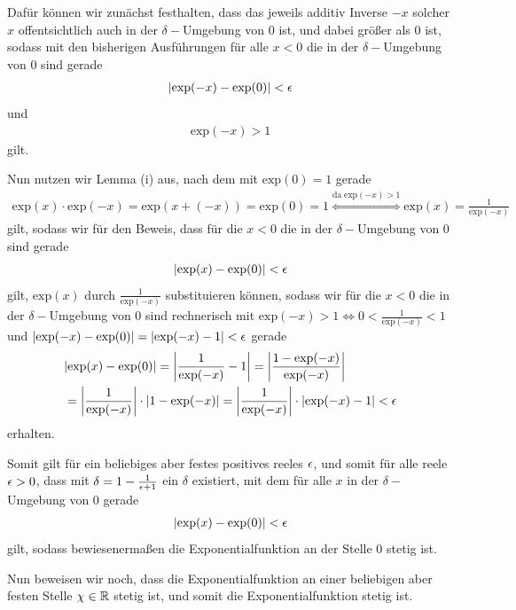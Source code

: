 \begin{lsg}
\begin{enumerate}[label=$\mathrm{(\roman*)}$, ref=$\mathrm{\roman*}$]
Dafür können wir zunächst festhalten, dass das jeweils additiv Inverse $-x$ 
solcher $x$ offentsichtlich auch in der $\delta-$Umgebung von $0$ ist, und dabei 
größer als $0$ ist, sodass mit den bisherigen Ausführungen für alle $x<0$ die in 
der $\delta-$Umgebung von $0$ sind gerade
\begin{align*}
  |\textrm{exp}(-x)-\textrm{exp}(0)|<\epsilon
 \end{align*}
und
\begin{align*}
  \textrm{exp}(-x)>1
 \end{align*}
 gilt.
 
 Nun nutzen wir Lemma (i) aus, nach dem mit $\textrm{exp}(0)=1$ gerade
 \begin{align*}
  \textrm{exp}(x) \cdot \textrm{exp}(-x)=\textrm{exp}(x+(-x))=\textrm{exp}(0)=1 
\stackrel{\textrm{da} \; \textrm{exp}(-x) >1}{\Leftrightarrow} \textrm{exp}(x)= 
\frac{1}{\textrm{exp}(-x)}
 \end{align*}gilt, sodass wir für den Beweis, dass für die $x<0$ die in der 
$\delta-$Umgebung von $0$ sind gerade
\begin{align*}
  |\textrm{exp}(x)-\textrm{exp}(0)|<\epsilon
 \end{align*}
gilt, $\textrm{exp}(x)$ durch $\frac{1}{\textrm{exp}(-x)}$ substituieren können, 
sodass wir für die $x<0$ die in der $\delta-$Umgebung von $0$ sind rechnerisch 
mit \newline $\textrm{exp}(-x)>1 \Leftrightarrow 0<\frac{1}{\textrm{exp}(-x)} <1 
$ und $|\textrm{exp}(-x)-\textrm{exp}(0)|=|\textrm{exp}(-x)-1|<\epsilon$ gerade
\begin{align*}
  &|\textrm{exp}(x)-\textrm{exp}(0)|= \left|\frac{1}{\textrm{exp}(-x)}-1\right| 
= \left|\frac{1-\textrm{exp}(-x)}{\textrm{exp}(-x)} \right|\\&= 
\left|\frac{1}{\textrm{exp}(-x)} \right|\cdot\left|1-\textrm{exp}(-x) \right|= 
\left|\frac{1}{\textrm{exp}(-x)} \right|\cdot\left|\textrm{exp}(-x)-1 \right|<\epsilon
 \end{align*}
erhalten.

Somit gilt für ein beliebiges aber festes positives reeles $\epsilon$, und somit für 
alle reele $\epsilon>0$, dass mit $\delta=1-\frac{1}{\epsilon+1}$ ein $\delta$ existiert, 
mit dem für alle $x$ in der $\delta-$ Umgebung von $0$ gerade
\begin{align*}
  |\textrm{exp}(x)-\textrm{exp}(0)|<\epsilon
 \end{align*}
gilt, sodass bewiesenermaßen die Exponentialfunktion an der Stelle $0$ stetig ist.
 
Nun beweisen wir noch, dass die Exponentialfunktion an einer beliebigen aber festen Stelle $\chi \in \mathbb{R}$ stetig ist, und somit die Exponentialfunktion stetig ist.


\end{enumerate}
\end{lsg}
